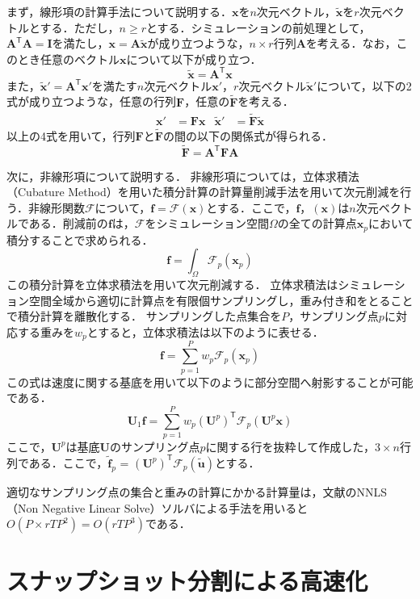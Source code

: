 \documentclass[uplatex,dvipdfmx,10pt,a4paper,notitlepage,oneside,twocolumn]{abst_jsarticle}
\begin{document}
まず，線形項の計算手法\cite{projection_base}について説明する．$\bm{x}$を$n$次元ベクトル，$\bm{\widetilde{x}} $を$r$次元ベクトルとする．ただし，$n \ge r$とする．シミュレーションの前処理として，$\bm{A}^{\mathsf T} \bm{A} = \bm{I}$を満たし，$\bm{x} = \bm{A}\bm{\widetilde{x}} $が成り立つような，$n \times r$行列$\bm{A}$を考える．なお，このとき任意のベクトル$\bm{x}$について以下が成り立つ．
 	\[
 		\bm{\widetilde{x}}  = \bm{A}^{\mathsf T}\bm{x}
 	\]
	また，$\bm{\widetilde{x}}'  = \bm{A}^{\mathsf T}\bm{x}'$を満たす$n$次元ベクトル$\bm{x}'$，$r$次元ベクトル$\bm{\widetilde{x}}'$について，以下の2式が成り立つような，任意の行列$\bm{F}$，任意の$\bm{\widetilde{F}}$を考える．
	 \begin{align*}
		\bm{x}' 			&= \bm{F}\bm{x}		&\bm{\widetilde{x}}' 		&= \bm{\widetilde{F}}\bm{\widetilde{x}} 
	\end{align*}
	以上の4式を用いて，行列$\bm{F}$と$\bm{\widetilde{F}}$の間の以下の関係式が得られる．
	\[
	\bm{\widetilde{F}} = \bm{A}^{\mathsf T}\bm{F}\bm{A}
	\]

次に，非線形項について説明する．
非線形項については，立体求積法（Cubature Method）を用いた積分計算の計算量削減手法を用いて次元削減を行う．非線形関数$\mathcal{F}$について，$\bm{f} = \mathcal{F}(\bm{x})$とする．ここで，$\bm{f}$，$(\bm{x})$は$n$次元ベクトルである．削減前の$\bm{f}$は，$\mathcal{F}$をシミュレーション空間$\Omega$の全ての計算点$\bm{x}_p$において積分することで求められる．
\[
	\bm{f} = \int_\Omega\mathcal{F}_p(\bm{x}_p)
\]
この積分計算を立体求積法を用いて次元削減する．
立体求積法はシミュレーション空間全域から適切に計算点を有限個サンプリングし，重み付き和をとることで積分計算を離散化する．
サンプリングした点集合を$P$，サンプリング点$p$に対応する重みを$w_p$とすると，立体求積法は以下のように表せる．
\[
	\bm{f} = \sum_{p=1}^Pw_p\mathcal{F}_p(\bm{x}_p)
\]
この式は速度に関する基底を用いて以下のように部分空間へ射影することが可能である．
\[
	\bm{U}_1\bm{f} = \sum_{p=1}^Pw_p(\bm{U}^p)^{\mathsf T}\mathcal{F}_p(\bm{U}^p\bm{x})
\]
ここで，$\bm{U}^p$は基底$\bm{U}$のサンプリング点$p$に関する行を抜粋して作成した，$3 \times n$行列である．ここで，$\bm{\widetilde{f}}_p$ = $(\bm{U}^p)^{\mathsf T}\mathcal{F}_p(\bm{\widetilde{u}})$とする．

適切なサンプリング点の集合と重みの計算にかかる計算量は，文献\cite{subspace}のNNLS（Non Negative Linear Solve）ソルバによる手法を用いると$O(P\times rTP^2) = O(rTP^3)$である．
\section{スナップショット分割による高速化}
\end{document}

